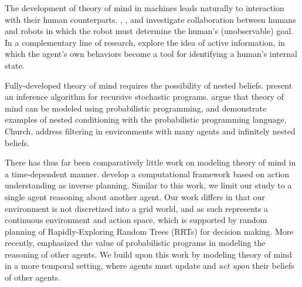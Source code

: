 \documentclass[twoside]{article}
\begin{document}
The development of theory of mind in machines leads naturally to interaction with their human counterparts. \textcite{awais2010human}, \textcite{fern2007decision}, and \textcite{nguyen2012capir} investigate collaboration between humans and robots in which the robot must determine the human's (unobservable) goal. In a complementary line of research, \textcite{sadigh2016information} explore the idea of active information, in which the agent's own behaviors become a tool for identifying a human's internal state.

Fully-developed theory of mind requires the possibility of nested beliefs. \textcite{koller1997effective} present an inference algorithm for recursive stochastic programs. \textcite{frith2005theory} argue that theory of mind can be modeled using probabilistic programming, and demonstrate examples of nested conditioning with the probabilistic programming language, Church. \textcite{zettlemoyer2009multi} address filtering in environments with many agents and infinitely nested beliefs. 

There has thus far been comparatively little work on modeling theory of mind in a time-dependent manner. 
\textcite{baker2009action} develop a computational framework based on action understanding as inverse planning. Similar to this work, we limit our study to a single agent reasoning about another agent. Our work differs in that our environment is not discretized into a grid world, and as such represents a continuous environment and action space, which is supported by random planning of Rapidly-Exploring Random Trees (RRTs) for decision making. More recently, \textcite{stuhlmuller2014reasoning} emphasized the value of probabilistic programs in modeling the reasoning of other agents. We build upon this work by modeling theory of mind in a more temporal setting, where agents must update and \textit{act upon} their beliefs of other agents.

\end{document}

